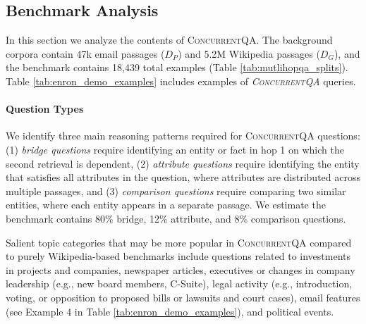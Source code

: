 \documentclass{article}
\newcommand{\datasetname}{\textsc{ConcurrentQA}\xspace}
\begin{document}
\subsection{Benchmark Analysis}
In this section we analyze the contents of \datasetname. The background corpora 
contain 47k email passages ($D_P$) and 5.2M Wikipedia passages ($D_G$), and the benchmark contains 18,439 total examples 
(Table \ref{tab:mutlihopqa_splits}). Table \ref{tab:enron_demo_examples} includes examples of \textit{\datasetname} queries. 



\paragraph{Question Types} We identify three main reasoning patterns required for \datasetname questions: (1) \textit{bridge questions} require identifying an entity or fact in hop 1 on which the second retrieval is dependent, (2) \textit{attribute questions} require identifying the entity that satisfies all attributes in the question, where attributes are distributed across multiple passages, and (3) \textit{comparison questions} require comparing two similar entities, where each entity appears in a separate passage. We estimate the benchmark contains 80\% bridge, 12\% attribute, and 8\% comparison questions.

Salient topic categories that may be more popular in \datasetname compared to purely Wikipedia-based benchmarks include 
questions 
related to investments in projects and companies, 
newspaper articles,
executives or changes in company leadership (e.g., new board members, C-Suite),
legal activity (e.g., introduction, voting, or opposition to proposed bills or lawsuits and court cases),
email features (see Example 4 in Table \ref{tab:enron_demo_examples}), and political events.
\end{document}
